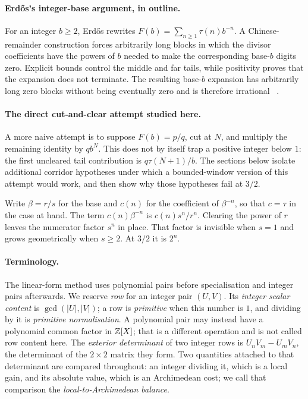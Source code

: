 \documentclass[11pt]{article}
\begin{document}
\paragraph{Erd\H{o}s's integer-base argument, in outline.}
For an integer $b\ge2$, Erd\H{o}s rewrites
$F(b)=\sum_{n\ge1}\tau(n)b^{-n}$.  A Chinese-remainder construction forces
arbitrarily long blocks in which the divisor coefficients have the powers of
$b$ needed to make the corresponding base-$b$ digits zero.  Explicit bounds
control the middle and far tails, while positivity proves that the expansion
does not terminate.  The resulting base-$b$ expansion has arbitrarily long
zero blocks without being eventually zero and is therefore irrational
~\cite[pp.~63--66]{erdos1948}.

\paragraph{The direct cut-and-clear attempt studied here.}
A more naive attempt is to suppose $F(b)=p/q$, cut at $N$, and multiply the
remaining identity by $qb^N$.  This does not by itself trap a positive integer
below $1$: the first uncleared tail contribution is
$q\tau(N+1)/b$.  The sections below isolate additional corridor hypotheses
under which a bounded-window version of this attempt would work, and then show
why those hypotheses fail at $3/2$.

Write $\beta=r/s$ for the base and $c(n)$ for the coefficient of $\beta^{-n}$,
so that $c=\tau$ in the case at hand.  The term $c(n)\beta^{-n}$ is
$c(n)s^{n}/r^{n}$.  Clearing the
power of $r$ leaves the numerator factor $s^{n}$ in place.  That factor is
invisible when $s=1$ and grows geometrically when $s\ge2$.  At $3/2$ it is
$2^{n}$.

\paragraph{Terminology.}
The linear-form method uses polynomial pairs before specialisation and integer
pairs afterwards.  We reserve \emph{row} for an integer pair $(U,V)$.  Its
\emph{integer scalar content} is $\gcd(|U|,|V|)$; a row is \emph{primitive}
when this number is $1$, and dividing by it is \emph{primitive normalisation}.
A polynomial pair may instead have a polynomial common factor in $\mathbb{Z}[X]$;
that is a different operation and is not called row content here.  The
\emph{exterior determinant} of two integer rows is
$U_{n}V_{m}-U_{m}V_{n}$, the determinant of the $2\times2$ matrix they form.
Two quantities attached to that determinant are compared throughout: an
integer dividing it, which is a local gain, and its absolute value, which is an
Archimedean cost; we call that comparison the \emph{local-to-Archimedean
balance}.
\end{document}
